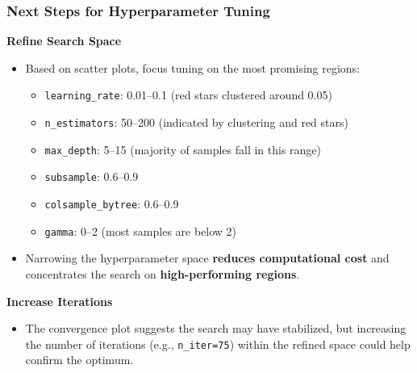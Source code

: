 \documentclass[
  letterpaper,
  DIV=11,
  numbers=noendperiod]{scrreprt}
\providecommand{\tightlist}{%
  \setlength{\itemsep}{0pt}\setlength{\parskip}{0pt}}\usepackage{longtable,booktabs,array}
\begin{document}
\subsubsection{Next Steps for Hyperparameter
Tuning}\label{next-steps-for-hyperparameter-tuning}

\textbf{Refine Search Space}

\begin{itemize}
\tightlist
\item
  Based on scatter plots, focus tuning on the most promising regions:

  \begin{itemize}
  \tightlist
  \item
    \texttt{learning\_rate}: 0.01--0.1 (red stars clustered around 0.05)
  \item
    \texttt{n\_estimators}: 50--200 (indicated by clustering and red
    stars)
  \item
    \texttt{max\_depth}: 5--15 (majority of samples fall in this range)
  \item
    \texttt{subsample}: 0.6--0.9
  \item
    \texttt{colsample\_bytree}: 0.6--0.9
  \item
    \texttt{gamma}: 0--2 (most samples are below 2)
  \end{itemize}
\item
  Narrowing the hyperparameter space \textbf{reduces computational cost}
  and concentrates the search on \textbf{high-performing regions}.
\end{itemize}

\textbf{Increase Iterations}

\begin{itemize}
\tightlist
\item
  The convergence plot suggests the search may have stabilized, but
  increasing the number of iterations (e.g., \texttt{n\_iter=75}) within
  the refined space could help confirm the optimum.
\end{itemize}
\end{document}
